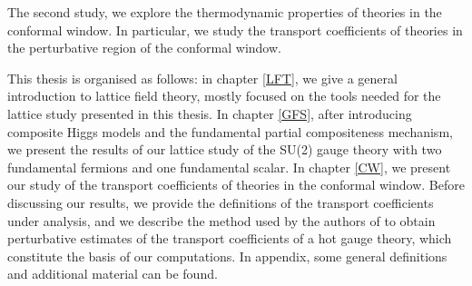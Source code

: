 The second study, we explore the thermodynamic properties of theories in the conformal window. In particular, we study the transport coefficients of theories in the perturbative region of the conformal window.


This thesis is organised as follows: in chapter \ref{LFT}, we give a general introduction to lattice field theory, mostly focused on the tools needed for the lattice study presented in this thesis. In chapter \ref{GFS}, after introducing composite Higgs models and the fundamental partial compositeness mechanism, we present the results of our lattice study of the SU(2) gauge theory with two fundamental fermions and one fundamental scalar. In chapter \ref{CW}, we present our study of the transport coefficients of theories in the conformal window. Before discussing our results, we provide the definitions of the transport coefficients under analysis, and we describe the method used by the authors of \cite{Arnold:2000dr} to obtain perturbative estimates of the transport coefficients of a hot gauge theory, which constitute the basis of our computations.
In appendix, some general definitions and additional material can be found.